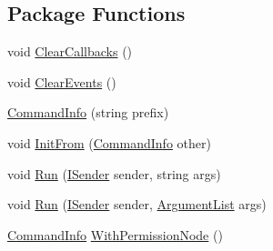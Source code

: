 \subsection*{Package Functions}
\begin{DoxyCompactItemize}
\item 
void \hyperlink{classOTA_1_1Command_1_1CommandInfo_aa3165a95ccb97ace7311db08291742c5}{Clear\+Callbacks} ()
\item 
void \hyperlink{classOTA_1_1Command_1_1CommandInfo_a1b11e063ec0b4e808cfafd5d87fa3255}{Clear\+Events} ()
\item 
\hyperlink{classOTA_1_1Command_1_1CommandInfo_ab794274d1b3e3e95443b67d441a7cae6}{Command\+Info} (string prefix)
\item 
void \hyperlink{classOTA_1_1Command_1_1CommandInfo_a9231f788edbecaf7abd2f3d2afcb81d1}{Init\+From} (\hyperlink{classOTA_1_1Command_1_1CommandInfo}{Command\+Info} other)
\item 
void \hyperlink{classOTA_1_1Command_1_1CommandInfo_a442a8ded95955d62803cfc5c87e761bc}{Run} (\hyperlink{interfaceOTA_1_1Command_1_1ISender}{I\+Sender} sender, string args)
\item 
void \hyperlink{classOTA_1_1Command_1_1CommandInfo_a79782337c9afbffa212f938d153e975b}{Run} (\hyperlink{interfaceOTA_1_1Command_1_1ISender}{I\+Sender} sender, \hyperlink{classOTA_1_1Command_1_1ArgumentList}{Argument\+List} args)
\item 
\hyperlink{classOTA_1_1Command_1_1CommandInfo}{Command\+Info} \hyperlink{classOTA_1_1Command_1_1CommandInfo_a355596e4342a13e073b21fb0752178d2}{With\+Permission\+Node} ()
\end{DoxyCompactItemize}

